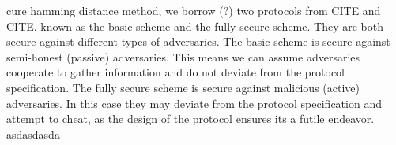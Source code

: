 \documentclass[12pt]{article}
\begin{document}
cure hamming distance method, we borrow (?) two protocols from CITE and CITE. known as the basic scheme and the fully secure scheme. They are both secure against different types of adversaries. The basic scheme is secure against semi-honest (passive) adversaries. This means we can assume adversaries cooperate to gather information and do not deviate from the protocol specification. The fully secure scheme is secure against malicious (active) adversaries. In this case they may deviate from the protocol specification and attempt to cheat, as the design of the protocol ensures its a futile endeavor. 
asdasdasda
\end{document}
